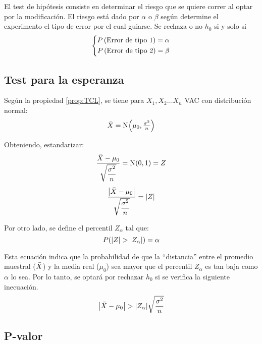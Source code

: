 \documentclass[a5paper,12pt,twoside]{book}
\begin{document}
El test de hipótesis consiste en determinar el riesgo que se quiere correr al optar por la modificación.
El riesgo está dado por $\alpha$ o $\beta$ según determine el experimento el tipo de error por el cual guiarse.
Se rechaza o no $h_0$ si y solo si
\begin{equation*}
    \left\{
    \begin{aligned}
        P \inParentheses{\text{Error de tipo 1}} = \alpha
        \\
        P \inParentheses{\text{Error de tipo 2}} = \beta
    \end{aligned}
    \right.
\end{equation*}


\subsection{Test para la esperanza}

Según la propiedad \ref{prop:TCL}, se tiene para $X_1, X_2 \dots X_n$ VAC con distribución normal:
\begin{equation*}
    \ave{X} = \fx[\nor]{\mu_0, \tfrac{\sigma^2}{n}}
\end{equation*}

Obteniendo, estandarizar:
\begin{gather*}
    \frac{\ave{X}-\mu_0}{\sqrt{\dfrac{\sigma^2}{n}}} = \fx[\nor]{0,1} = Z
    \\[1ex]
    \frac{\norm{\ave{X}-\mu_0}}{\sqrt{\dfrac{\sigma^2}{n}}} = \norm{Z}
\end{gather*}

Por otro lado, se define el percentil $Z_\alpha$ tal que:
\begin{equation*}
    P(\norm{Z}>\norm{Z_\alpha}) = \alpha
\end{equation*}

Esta ecuación indica que la probabilidad de que la ``distancia'' entre el promedio muestral ($\ave{X}$) y la media real ($\mu_0$) sea mayor que el percentil $Z_\alpha$ es tan baja como $\alpha$ lo sea.
Por lo tanto, se optará por rechazar $h_0$ si se verifica la siguiente inecuación.
\begin{equation*}
    \norm{\ave{X}-\mu_0} > \norm{Z_\alpha} \sqrt{\dfrac{\sigma^2}{n}}
\end{equation*}


\subsection{P-valor}
\end{document}
